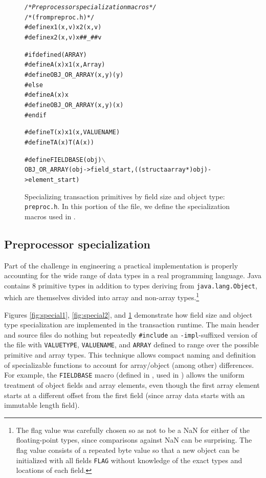 \begin{figure}\sis\fontsize{8}{9}\begin{alltt}
\textit{/* Preprocessor specialization macros */}
/* (from preproc.h) */
#define x1(x,v) x2(x,v)
#define x2(x,v) x ## _ ## v

#if defined(ARRAY)
# define A(x) x1(x,Array)
# define OBJ_OR_ARRAY(x,y) (y)
#else
# define A(x) x
# define OBJ_OR_ARRAY(x,y) (x)
#endif

#define T(x) x1(x,VALUENAME)
#define TA(x) T(A(x))

#define FIELDBASE(obj) \(\backslash\)
         OBJ_OR_ARRAY(obj->field_start,((struct aarray *)obj)->element_start)
\end{alltt}
\caption[Specializing transaction primitives by field size and object
 type (\texttt{preproc.h}).]
{Specializing transaction primitives by field size and object
 type: \texttt{preproc.h}.  In this portion of the file, we define the
 specialization macros used in .}
\label{fig:special3}
\end{figure}

\subsection{Preprocessor specialization}
Part of the challenge in engineering a practical implementation is
properly accounting for the wide range of data types in a real
programming language.  Java contains 8 primitive types in addition to
types deriving from \texttt{java.lang.Object},
which are themselves divided into array and non-array
types.\footnote{The \flex flag value was carefully chosen so as not to be a NaN for either
of the floating-point types, since comparisons against NaN can be
surprising.  The flag value consists of a repeated byte value so that a new
object can be initialized with all fields \texttt{FLAG} without
knowledge of the exact types and locations of each field.}

Figures \ref{fig:special1}, \ref{fig:special2}, and \ref{fig:special3}
demonstrate how
field size and object type specialization are implemented in the \flex
transaction runtime.  The main header and source files do nothing but
repeatedly \texttt{\#include} an \texttt{-impl}-suffixed version of
the file with \texttt{VALUETYPE}, \texttt{VALUENAME}, and
\texttt{ARRAY} defined to range over the possible primitive and array
types.  This technique allows compact naming and definition of
specializable functions to account for array/object (among other) differences.
For example, the \texttt{FIELDBASE} macro (defined in ,
used in ) allows the uniform treatment of object fields
and array elements, even though the first array element
starts at a different offset from the first field (since array data starts with
an immutable length field).

